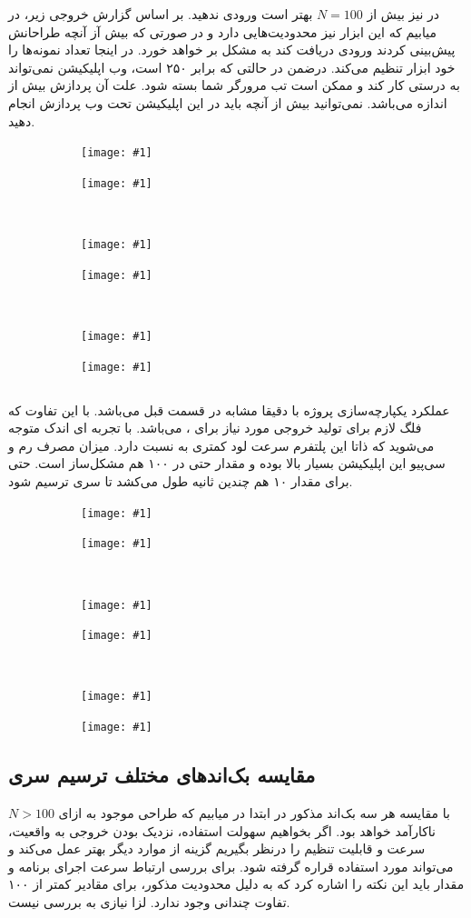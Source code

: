 \documentclass[a4paper]{report}
\newcommand{\subfigr}[2]{
	\begin{subfigure}{0.5\textwidth}
		\texttt{[image: \#1]}
		\caption*{#2}
	\end{subfigure}
}
\begin{document}
در  نیز بیش از $N=100$ بهتر است ورودی ندهید. بر اساس گزارش خروجی زیر، در میابیم که این ابزار نیز محدودیت‌هایی دارد
و در صورتی که بیش آز آنچه طراحانش پیش‌بینی کردند ورودی دریافت کند به مشکل بر خواهد خورد. در اینجا تعداد نمونه‌ها را خود ابزار
تنظیم می‌کند. درضمن در حالتی که  برابر ۲۵۰ است، وب اپلیکیشن نمی‌تواند به درستی کار کند و ممکن است تب مرورگر شما بسته شود.
علت آن پردازش بیش از اندازه می‌باشد. نمی‌توانید بیش از آنچه باید در این اپلیکیشن تحت وب پردازش انجام دهید.

\begin{figure}[H]
\subfigr{assets/desmos_x3_1.png}{}
\subfigr{assets/desmos_x3_2.png}{}
\\[\smallskipamount]
\subfigr{assets/desmos_x3_5.png}{}
\subfigr{assets/desmos_x3_20.png}{}
\\[\smallskipamount]
\subfigr{assets/desmos_x3_100.png}{}
\subfigr{assets/desmos_x3_250.png}{}

\caption*{
}
\end{figure}

\newpage
\subsection{}
عملکرد یکپارچه‌سازی پروژه با  دقیقا مشابه  در قسمت قبل می‌باشد. با این تفاوت که فلگ لازم برای
تولید خروجی مورد نیاز برای ،‌  می‌باشد. با تجربه ای اندک متوجه می‌شوید که ذاتا این پلتفرم سرعت لود کمتری
به نسبت  دارد. میزان مصرف رم و سی‌پیو این اپلیکیشن بسیار بالا بوده و مقدار  حتی در ۱۰۰ هم مشکل‌ساز است.
حتی برای مقدار ۱۰ هم چندین ثانیه طول می‌کشد تا سری ترسیم شود.

\begin{figure}[H]
\subfigr{assets/geogebra_x3_1.png}{}
\subfigr{assets/geogebra_x3_2.png}{}
\\[\smallskipamount]
\subfigr{assets/geogebra_x3_5.png}{}
\subfigr{assets/geogebra_x3_20.png}{}
\\[\smallskipamount]
\subfigr{assets/geogebra_x3_50.png}{}
\subfigr{assets/geogebra_x3_100.png}{}

\caption*{
}
\end{figure}

\subsection{مقایسه بک‌اندهای مختلف ترسیم سری}
با مقایسه هر سه بک‌اند مذکور در ابتدا در میابیم که طراحی موجود به ازای
$N>100$
ناکارآمد خواهد بود. اگر بخواهیم سهولت استفاده، نزدیک بودن خروجی به واقعیت، سرعت و قابلیت تنظیم را درنظر بگیریم
گزینه  از موارد دیگر بهتر عمل می‌کند و می‌تواند مورد استفاده قراره گرفته شود.
برای بررسی ارتباط سرعت اجرای برنامه و مقدار  باید این نکته را اشاره کرد که به دلیل محدودیت مذکور، برای مقادیر کمتر از ۱۰۰
تفاوت چندانی وجود ندارد. لزا نیازی به بررسی نیست.
\end{document}
